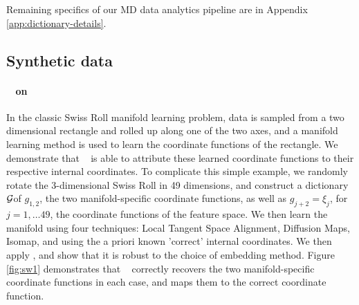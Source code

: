 {Remaining specifics of our MD data analytics pipeline are in Appendix \ref{app:dictionary-details}.

\subsection{Synthetic data}\label{sec:syndata}

\paragraph {\ouralg~ on \srdata}
\label{sec:swiss}

In the classic Swiss Roll manifold learning problem, data is sampled
from a two dimensional rectangle and rolled up along one of the two axes, and a manifold learning method is used to learn the coordinate functions of the rectangle.  We demonstrate that \ouralg~ is able to attribute these learned coordinate functions to their respective internal coordinates.  To complicate this simple example, we randomly rotate the 3-dimensional Swiss Roll in 49 dimensions, and construct a dictionary ${\cal G}$of $g_{1,2}$, the two manifold-specific coordinate functions, as well as $g_{j+2}=\xi_j$, for $j=1,\ldots 49$, the coordinate functions of the feature space.  We then learn the manifold using four techniques: Local Tangent Space Alignment, Diffusion Maps, Isomap, and using the a priori known 'correct' internal coordinates.  We then apply \ouralg, and show that it is robust to the choice of embedding method. Figure \ref{fig:sw1} demonstrates that \ouralg~ correctly recovers the two manifold-specific coordinate functions in each case, and maps them to the correct coordinate function.

}
